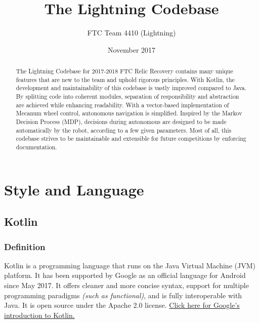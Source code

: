\documentclass[letterpaper]{article}
\begin{document}
\title{The Lightning Codebase}
\author{FTC Team 4410 (Lightning)}
\date{November 2017}
\maketitle

\begin{abstract}
The Lightning Codebase for 2017-2018 FTC Relic Recovery contains many unique features that are new to the team and uphold rigorous principles. With Kotlin, the development and maintainability of this codebase is vastly improved compared to Java. By splitting code into coherent modules, separation of responsibility and abstraction are achieved while enhancing readability. With a vector-based implementation of Mecanum wheel control, autonomous navigation is simplified. Inspired by the Markov Decision Process (MDP), decisions during autonomous are designed to be made automatically by the robot, according to a few given parameters. Most of all, this codebase strives to be maintainable and extensible for future competitions by enforcing documentation.
\end{abstract}
\section{Style and Language}

\subsection{Kotlin}

\subsubsection{Definition}
Kotlin is a programming language that runs on the Java Virtual Machine (JVM) platform. It has been supported by Google as an official language for Android since May 2017. It offers cleaner and more concise syntax, support for multiple programming paradigms \textit{(such as functional)}, and is fully interoperable with Java. It is open source under the Apache 2.0 license. \href{https://developer.android.com/kotlin/index.html}{Click here for Google's introduction to Kotlin.}
\end{document}
